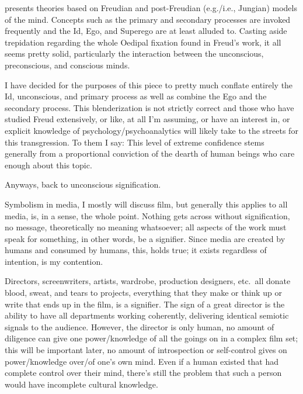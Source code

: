 \documentclass[../butidigress.tex]{subfiles}
\begin{document}

 presents theories based on Freudian and post-Freudian (e.g./i.e., Jungian) models of the mind.
Concepts such as the primary and secondary processes are invoked frequently and the Id, Ego, and Superego are at least alluded to.
Casting aside trepidation regarding the whole Oedipal fixation found in Freud's work, it all seems pretty solid, particularly the interaction between the unconscious, preconscious, and conscious minds.

I have decided for the purposes of this piece to pretty much conflate entirely the Id, unconscious, and primary process as well as combine the Ego and the secondary process.
This blenderization is not strictly correct and those who have studied Freud extensively, or like, at all I'm assuming, or have an interest in, or explicit knowledge of psychology/psychoanalytics will likely take to the streets for this transgression.
To them I say: 
This level of extreme confidence stems generally from a proportional conviction of the dearth of human beings who care enough about this topic.

Anyways, back to unconscious signification.

Symbolism in media, I mostly will discuss film, but generally this applies to all media, is, in a sense, the whole point.
Nothing gets across without signification, no message, theoretically no meaning whatsoever; all aspects of the work must speak for something, in other words, be a signifier.
Since media are created by humans and consumed by humans, this,  holds true; it exists regardless of intention, is my contention.

Directors, screenwriters, artists, wardrobe, production designers, etc.\ all donate blood, sweat, and tears to projects, everything that they make or think up or write that ends up in the film, is a signifier.
The sign of a great director is the ability to have all departments working coherently, delivering identical semiotic signals to the audience.
However, the director is only human, no amount of diligence can give one power/knowledge of all the goings on in a complex film set; this will be important later, no amount of introspection or self-control gives on power/knowledge over/of one's own mind.
Even if a human existed that had complete control over their mind, there's still the problem that such a person would have incomplete cultural knowledge.
\end{document}

